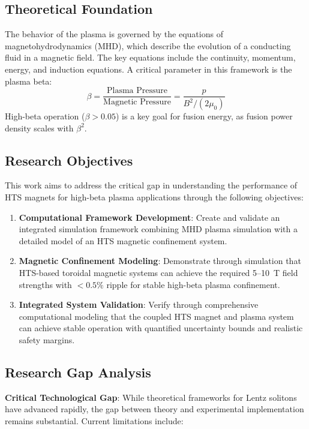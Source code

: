 \documentclass[12pt,a4paper]{article}
\begin{document}
\subsection{Theoretical Foundation}

The behavior of the plasma is governed by the equations of magnetohydrodynamics (MHD), which describe the evolution of a conducting fluid in a magnetic field. The key equations include the continuity, momentum, energy, and induction equations. A critical parameter in this framework is the plasma beta:
\begin{equation}
\beta = \frac{\text{Plasma Pressure}}{\text{Magnetic Pressure}} = \frac{p}{B^2 / (2\mu_0)}
\end{equation}
High-beta operation ($\beta > 0.05$) is a key goal for fusion energy, as fusion power density scales with $\beta^2$.

\subsection{Research Objectives}

This work aims to address the critical gap in understanding the performance of HTS magnets for high-beta plasma applications through the following objectives:

\begin{enumerate}
\item \textbf{Computational Framework Development}: Create and validate an integrated simulation framework combining MHD plasma simulation with a detailed model of an HTS magnetic confinement system.

\item \textbf{Magnetic Confinement Modeling}: Demonstrate through simulation that HTS-based toroidal magnetic systems can achieve the required 5--10~T field strengths with $<0.5\%$ ripple for stable high-beta plasma confinement.

\item \textbf{Integrated System Validation}: Verify through comprehensive computational modeling that the coupled HTS magnet and plasma system can achieve stable operation with quantified uncertainty bounds and realistic safety margins.
\end{enumerate}

\subsection{Research Gap Analysis}

\textbf{Critical Technological Gap}: While theoretical frameworks for Lentz solitons have advanced rapidly, the gap between theory and experimental implementation remains substantial. Current limitations include:
\end{document}
